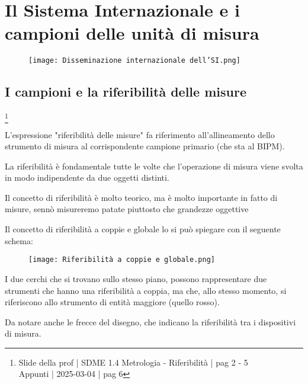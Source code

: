 \chapter{Il Sistema Internazionale e i campioni delle unità di misura}

\begin{figure}[h]
    \centering
    \texttt{[image: Disseminazione internazionale dell'SI.png]}
\end{figure}

\newpage 

\section{I campioni e la riferibilità delle misure}
\footnote{Slide della prof | SDME 1.4 Metrologia - Riferibilità | pag 2 - 5 \\  
Appunti | 2025-03-04 | pag 6}

L'espressione "riferibilità delle misure" fa riferimento all'allineamento dello strumento 
di misura al corrispondente campione primario (che sta al BIPM). \newline 

La riferibilità è fondamentale tutte le volte che l'operazione di misura viene svolta in modo indipendente da due oggetti distinti. \newline 

\begin{tcolorbox}
    Il concetto di riferibilità è molto teorico, ma è molto importante in fatto di misure, 
    sennò misureremo patate piuttosto che grandezze oggettive
\end{tcolorbox}

Il concetto di riferibilità a coppie e globale lo si può spiegare con il seguente schema: 

\begin{figure}[h]
    \centering
    \texttt{[image: Riferibilità a coppie e globale.png]}
\end{figure}

I due cerchi che si trovano sullo stesso piano, 
possono rappresentare due strumenti che hanno una riferibilità a coppia, 
ma che, allo stesso momento, si riferiscono allo strumento di entità maggiore 
(quello rosso). \newline 

Da notare anche le frecce del disegno, che indicano la riferibilità tra i dispositivi di misura. \newline 

